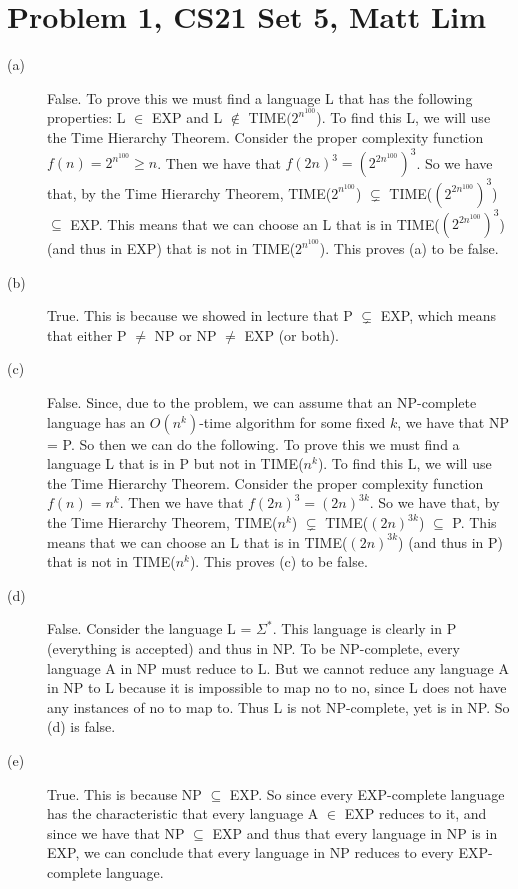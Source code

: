 \documentclass{article}
\begin{document}



\section*{Problem 1, CS21 Set 5, Matt Lim}
\begin{description}
    \item[(a)] False. To prove this we must find a language L that has the
        following properties: L $\in$ EXP and L $\notin$ TIME$(2^{n^{100}}$).
        To find this L, we will use the Time Hierarchy Theorem. Consider
        the proper complexity function $f(n) = 2^{n^{100}} \ge n$. Then we
        have that $f(2n)^{3} = (2^{2n^{100}})^{3}$. So we have that, by
        the Time Hierarchy Theorem,
        TIME($2^{n^{100}}$) $\subsetneq$ TIME($(2^{2n^{100}})^{3}$) $\subseteq$
        EXP. This means that we can choose an L that is in
        TIME($(2^{2n^{100}})^{3}$) (and thus in EXP) that is not in
        TIME($2^{n^{100}}$). This proves (a) to be false.

    \item[(b)] True. This is because we showed in lecture that P $\subsetneq$
        EXP, which means that either P $\neq$ NP or NP $\neq$ EXP (or both).
    \item[(c)] False. Since, due to the problem, we can assume that an
        NP-complete language has an $O(n^{k})$-time algorithm for some fixed
        $k$, we have that NP = P. So then we can do the following.
        To prove this we must find a language L that is in P
        but not in TIME($n^{k}$). To find this L, we will use the Time Hierarchy
        Theorem. Consider the proper complexity function $f(n) = n^{k}$. Then
        we have that $f(2n)^{3} = (2n)^{3k}$. So we have that, by the Time
        Hierarchy Theorem, TIME($n^{k}$) $\subsetneq$ TIME($(2n)^{3k}$)
        $\subseteq$ P. This means that we can choose an L that is in
        TIME($(2n)^{3k}$) (and thus in P) that is not in TIME($n^{k}$). This
        proves (c) to be false.
    \item[(d)] False. Consider the language L = $\Sigma ^{*}$. This language is
        clearly in P (everything is accepted) and thus in NP. To be NP-complete,
        every language A in NP
        must reduce to L. But we cannot reduce any language A in NP to L because
        it is impossible to map no to no, since L does not have any instances of
        no to map to. Thus L is not NP-complete, yet is in NP. So (d) is false.
    \item[(e)] True. This is because NP $\subseteq$ EXP. So since every
        EXP-complete language has the characteristic that every language
        A $\in$ EXP reduces to it, and since we have that NP $\subseteq$ EXP and
        thus that every language in NP is in EXP, we can conclude that every
        language in NP reduces to every EXP-complete language.
\end{description}
\end{document}
